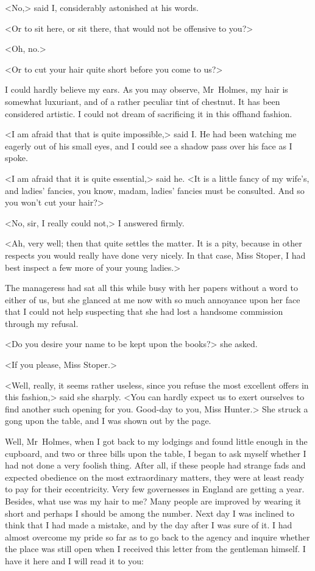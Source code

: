 <No,> said I, considerably astonished at his words.

<Or to sit here, or sit there, that would not be offensive to you?>

<Oh, no.>

<Or to cut your hair quite short before you come to us?>

I could hardly believe my ears. As you may observe, Mr~Holmes, my hair is somewhat luxuriant, and of a rather peculiar tint of chestnut. It has been considered artistic. I could not dream of sacrificing it in this offhand fashion.

<I am afraid that that is quite impossible,> said I\@. He had been watching me eagerly out of his small eyes, and I could see a shadow pass over his face as I spoke.

<I am afraid that it is quite essential,> said he. <It is a little fancy of my wife's, and ladies' fancies, you know, madam, ladies' fancies must be consulted. And so you won't cut your hair?>

<No, sir, I really could not,> I answered firmly.

<Ah, very well; then that quite settles the matter. It is a pity, because in other respects you would really have done very nicely. In that case, Miss Stoper, I had best inspect a few more of your young ladies.>

The manageress had sat all this while busy with her papers without a word to either of us, but she glanced at me now with so much annoyance upon her face that I could not help suspecting that she had lost a handsome commission through my refusal.

<Do you desire your name to be kept upon the books?> she asked.

<If you please, Miss Stoper.>

<Well, really, it seems rather useless, since you refuse the most excellent offers in this fashion,> said she sharply. <You can hardly expect us to exert ourselves to find another such opening for you. Good-day to you, Miss Hunter.> She struck a gong upon the table, and I was shown out by the page.

Well, Mr~Holmes, when I got back to my lodgings and found little enough in the cupboard, and two or three bills upon the table, I began to ask myself whether I had not done a very foolish thing. After all, if these people had strange fads and expected obedience on the most extraordinary matters, they were at least ready to pay for their eccentricity. Very few governesses in England are getting  a year. Besides, what use was my hair to me? Many people are improved by wearing it short and perhaps I should be among the number. Next day I was inclined to think that I had made a mistake, and by the day after I was sure of it. I had almost overcome my pride so far as to go back to the agency and inquire whether the place was still open when I received this letter from the gentleman himself. I have it here and I will read it to you:


